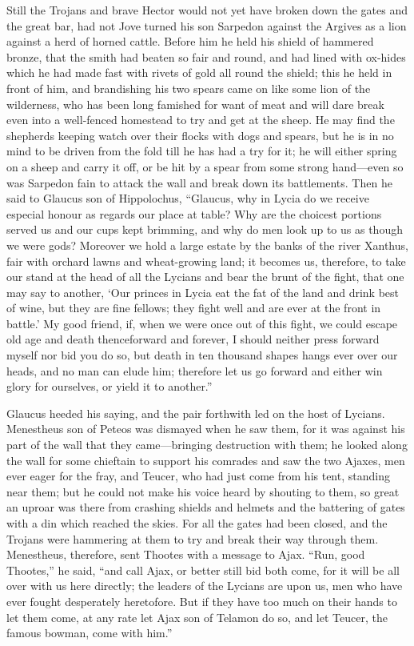 Still the Trojans and brave Hector would not yet have broken down the
gates and the great bar, had not Jove turned his son Sarpedon against the
Argives as a lion against a herd of horned cattle. Before him he held his
shield of hammered bronze, that the smith had beaten so fair and round,
and had lined with ox-hides which he had made fast with rivets of gold all
round the shield; this he held in front of him, and brandishing his two
spears came on like some lion of the wilderness, who has been long
famished for want of meat and will dare break even into a well-fenced
homestead to try and get at the sheep. He may find the shepherds keeping
watch over their flocks with dogs and spears, but he is in no mind to be
driven from the fold till he has had a try for it; he will either spring
on a sheep and carry it off, or be hit by a spear from some strong hand—even
so was Sarpedon fain to attack the wall and break down its battlements.
Then he said to Glaucus son of Hippolochus, “Glaucus, why in Lycia do we
receive especial honour as regards our place at table? Why are the
choicest portions served us and our cups kept brimming, and why do men
look up to us as though we were gods? Moreover we hold a large estate by
the banks of the river Xanthus, fair with orchard lawns and wheat-growing
land; it becomes us, therefore, to take our stand at the head of all the
Lycians and bear the brunt of the fight, that one may say to another, ‘Our
princes in Lycia eat the fat of the land and drink best of wine, but they
are fine fellows; they fight well and are ever at the front in battle.’ My
good friend, if, when we were once out of this fight, we could escape old
age and death thenceforward and forever, I should neither press forward
myself nor bid you do so, but death in ten thousand shapes hangs ever over
our heads, and no man can elude him; therefore let us go forward and
either win glory for ourselves, or yield it to another.”

Glaucus heeded his saying, and the pair forthwith led on the host of
Lycians. Menestheus son of Peteos was dismayed when he saw them, for it
was against his part of the wall that they came—bringing destruction
with them; he looked along the wall for some chieftain to support his
comrades and saw the two Ajaxes, men ever eager for the fray, and Teucer,
who had just come from his tent, standing near them; but he could not make
his voice heard by shouting to them, so great an uproar was there from
crashing shields and helmets and the battering of gates with a din which
reached the skies. For all the gates had been closed, and the Trojans were
hammering at them to try and break their way through them. Menestheus,
therefore, sent Thootes with a message to Ajax. “Run, good Thootes,” he
said, “and call Ajax, or better still bid both come, for it will be all
over with us here directly; the leaders of the Lycians are upon us, men
who have ever fought desperately heretofore. But if they have too much on
their hands to let them come, at any rate let Ajax son of Telamon do so,
and let Teucer, the famous bowman, come with him.”

